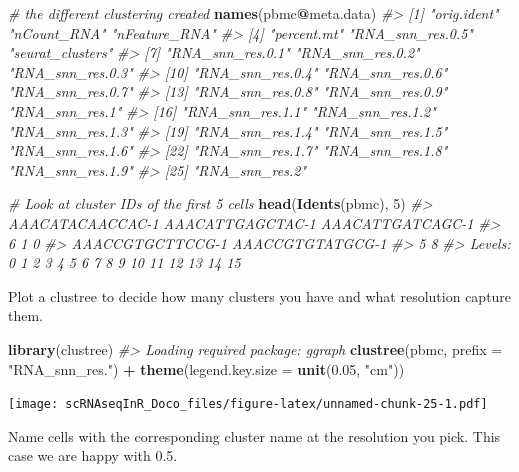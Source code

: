 \documentclass[
]{book}
\newenvironment{Shaded}{\begin{snugshade}}{\end{snugshade}}
\newcommand{\AttributeTok}[1]{\textcolor[rgb]{0.13,0.29,0.53}{#1}}
\newcommand{\CommentTok}[1]{\textcolor[rgb]{0.56,0.35,0.01}{\textit{#1}}}
\newcommand{\DecValTok}[1]{\textcolor[rgb]{0.00,0.00,0.81}{#1}}
\newcommand{\FloatTok}[1]{\textcolor[rgb]{0.00,0.00,0.81}{#1}}
\newcommand{\FunctionTok}[1]{\textcolor[rgb]{0.13,0.29,0.53}{\textbf{#1}}}
\newcommand{\NormalTok}[1]{#1}
\newcommand{\SpecialCharTok}[1]{\textcolor[rgb]{0.81,0.36,0.00}{\textbf{#1}}}
\newcommand{\StringTok}[1]{\textcolor[rgb]{0.31,0.60,0.02}{#1}}
\begin{document}
\begin{Shaded}
\begin{Highlighting}[]
\CommentTok{\# the different clustering created}
\FunctionTok{names}\NormalTok{(pbmc}\SpecialCharTok{@}\NormalTok{meta.data)}
\CommentTok{\#\textgreater{}  [1] "orig.ident"      "nCount\_RNA"      "nFeature\_RNA"   }
\CommentTok{\#\textgreater{}  [4] "percent.mt"      "RNA\_snn\_res.0.5" "seurat\_clusters"}
\CommentTok{\#\textgreater{}  [7] "RNA\_snn\_res.0.1" "RNA\_snn\_res.0.2" "RNA\_snn\_res.0.3"}
\CommentTok{\#\textgreater{} [10] "RNA\_snn\_res.0.4" "RNA\_snn\_res.0.6" "RNA\_snn\_res.0.7"}
\CommentTok{\#\textgreater{} [13] "RNA\_snn\_res.0.8" "RNA\_snn\_res.0.9" "RNA\_snn\_res.1"  }
\CommentTok{\#\textgreater{} [16] "RNA\_snn\_res.1.1" "RNA\_snn\_res.1.2" "RNA\_snn\_res.1.3"}
\CommentTok{\#\textgreater{} [19] "RNA\_snn\_res.1.4" "RNA\_snn\_res.1.5" "RNA\_snn\_res.1.6"}
\CommentTok{\#\textgreater{} [22] "RNA\_snn\_res.1.7" "RNA\_snn\_res.1.8" "RNA\_snn\_res.1.9"}
\CommentTok{\#\textgreater{} [25] "RNA\_snn\_res.2"}

\CommentTok{\# Look at cluster IDs of the first 5 cells}
\FunctionTok{head}\NormalTok{(}\FunctionTok{Idents}\NormalTok{(pbmc), }\DecValTok{5}\NormalTok{)}
\CommentTok{\#\textgreater{} AAACATACAACCAC{-}1 AAACATTGAGCTAC{-}1 AAACATTGATCAGC{-}1 }
\CommentTok{\#\textgreater{}                6                1                0 }
\CommentTok{\#\textgreater{} AAACCGTGCTTCCG{-}1 AAACCGTGTATGCG{-}1 }
\CommentTok{\#\textgreater{}                5                8 }
\CommentTok{\#\textgreater{} Levels: 0 1 2 3 4 5 6 7 8 9 10 11 12 13 14 15}
\end{Highlighting}
\end{Shaded}

Plot a clustree to decide how many clusters you have and what resolution capture them.

\begin{Shaded}
\begin{Highlighting}[]
\FunctionTok{library}\NormalTok{(clustree)}
\CommentTok{\#\textgreater{} Loading required package: ggraph}
\FunctionTok{clustree}\NormalTok{(pbmc, }\AttributeTok{prefix =} \StringTok{"RNA\_snn\_res."}\NormalTok{) }\SpecialCharTok{+} \FunctionTok{theme}\NormalTok{(}\AttributeTok{legend.key.size =} \FunctionTok{unit}\NormalTok{(}\FloatTok{0.05}\NormalTok{, }\StringTok{"cm"}\NormalTok{))}
\end{Highlighting}
\end{Shaded}

\texttt{[image: scRNAseqInR\_Doco\_files/figure-latex/unnamed-chunk-25-1.pdf]}

Name cells with the corresponding cluster name at the resolution you pick. This case we are happy with 0.5.
\end{document}

